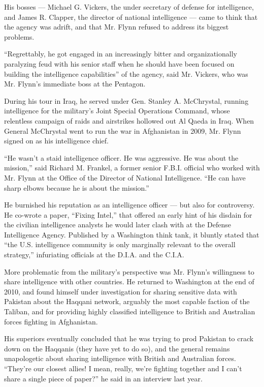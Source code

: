 His bosses --- Michael G. Vickers, the under secretary of defense for
intelligence, and James R. Clapper, the director of national
intelligence --- came to think that the agency was adrift, and that Mr.
Flynn refused to address its biggest problems.

``Regrettably, he got engaged in an increasingly bitter and
organizationally paralyzing feud with his senior staff when he should
have been focused on building the intelligence capabilities'' of the
agency, said Mr. Vickers, who was Mr. Flynn's immediate boss at the
Pentagon.

During his tour in Iraq, he served under Gen. Stanley A. McChrystal,
running intelligence for the military's Joint Special Operations
Command, whose relentless campaign of raids and airstrikes hollowed out
Al Qaeda in Iraq. When General McChrystal went to run the war in
Afghanistan in 2009, Mr. Flynn signed on as his intelligence chief.

``He wasn't a staid intelligence officer. He was aggressive. He was
about the mission,'' said Richard M. Frankel, a former senior F.B.I.
official who worked with Mr. Flynn at the Office of the Director of
National Intelligence. ``He can have sharp elbows because he is about
the mission.''

He burnished his reputation as an intelligence officer --- but also for
controversy. He co-wrote a paper, ``Fixing Intel,'' that offered an
early hint of his disdain for the civilian intelligence analysts he
would later clash with at the Defense Intelligence Agency. Published by
a Washington think tank, it bluntly stated that ``the U.S. intelligence
community is only marginally relevant to the overall strategy,''
infuriating officials at the D.I.A. and the C.I.A.

More problematic from the military's perspective was Mr. Flynn's
willingness to share intelligence with other countries. He returned to
Washington at the end of 2010, and found himself under investigation for
sharing sensitive data with Pakistan about the Haqqani network, arguably
the most capable faction of the Taliban, and for providing highly
classified intelligence to British and Australian forces fighting in
Afghanistan.

His superiors eventually concluded that he was trying to prod Pakistan
to crack down on the Haqqanis (they have yet to do so), and the general
remains unapologetic about sharing intelligence with British and
Australian forces. ``They're our closest allies! I mean, really, we're
fighting together and I can't share a single piece of paper?'' he said
in an interview last year.

